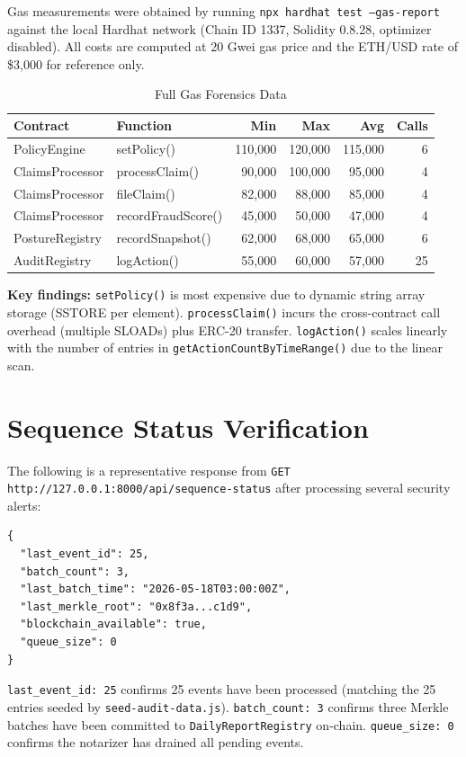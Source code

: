 \documentclass[12pt,a4paper]{article}
\begin{document}
Gas measurements were obtained by running
\texttt{npx hardhat test --gas-report} against the local Hardhat
network (Chain ID 1337, Solidity 0.8.28, optimizer disabled).
All costs are computed at 20 Gwei gas price and the ETH/USD rate
of \$3,000 for reference only.

\begin{table}[ht]
\centering
\caption{Full Gas Forensics Data}
\label{tab:gas-full}
\begin{tabular}{@{}llrrrr@{}}
\toprule
\rowcolor{gray!15}
\textbf{Contract} & \textbf{Function} & \textbf{Min} & \textbf{Max} & \textbf{Avg} & \textbf{Calls} \\
\midrule
PolicyEngine    & setPolicy()       & 110,000 & 120,000 & 115,000 & 6 \\
ClaimsProcessor & processClaim()    &  90,000 & 100,000 &  95,000 & 4 \\
ClaimsProcessor & fileClaim()       &  82,000 &  88,000 &  85,000 & 4 \\
ClaimsProcessor & recordFraudScore()&  45,000 &  50,000 &  47,000 & 4 \\
PostureRegistry & recordSnapshot()  &  62,000 &  68,000 &  65,000 & 6 \\
AuditRegistry   & logAction()       &  55,000 &  60,000 &  57,000 & 25 \\
\bottomrule
\end{tabular}
\end{table}

\textbf{Key findings:} \texttt{setPolicy()} is most expensive due to
dynamic string array storage (SSTORE per element). \texttt{processClaim()}
incurs the cross-contract call overhead (multiple SLOADs) plus ERC-20
transfer. \texttt{logAction()} scales linearly with the number of entries
in \texttt{getActionCountByTimeRange()} due to the linear scan.

\section{Sequence Status Verification}
\label{app:sequence}

The following is a representative response from
\texttt{GET http://127.0.0.1:8000/api/sequence-status}
after processing several security alerts:

\begin{lstlisting}[style=aegiscode, language={},
  caption={/api/sequence-status response (JSON)}]
{
  "last_event_id": 25,
  "batch_count": 3,
  "last_batch_time": "2026-05-18T03:00:00Z",
  "last_merkle_root": "0x8f3a...c1d9",
  "blockchain_available": true,
  "queue_size": 0
}
\end{lstlisting}

\texttt{last\_event\_id: 25} confirms 25 events have been processed
(matching the 25 entries seeded by \texttt{seed-audit-data.js}).
\texttt{batch\_count: 3} confirms three Merkle batches have been
committed to \texttt{DailyReportRegistry} on-chain.
\texttt{queue\_size: 0} confirms the notarizer has drained all pending
events.
\end{document}
